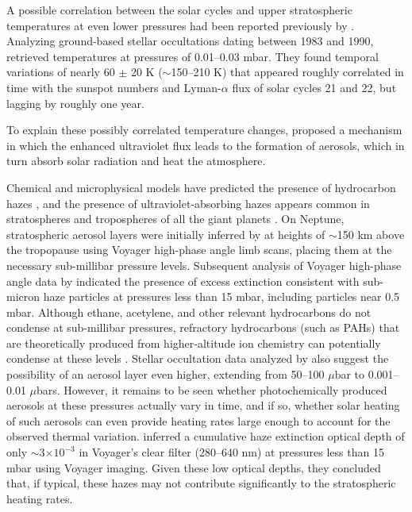 \documentclass[twocolumn,10pt]{aastex631}
\begin{document}
A possible correlation between the solar cycles and upper stratospheric temperatures at even lower pressures had been reported previously by \citet{roques1994neptune}. Analyzing ground-based stellar occultations dating between 1983 and 1990, \citet{roques1994neptune} retrieved temperatures at pressures of 0.01--0.03 mbar. They found temporal variations of nearly 60 $\pm$ 20 K ($\sim$150--210 K) that appeared roughly correlated in time with the sunspot numbers and Lyman-$\alpha$ flux of solar cycles 21 and 22, but lagging by roughly one year. 

To explain these possibly correlated temperature changes, \citet{roques1994neptune} proposed a mechanism in which the enhanced ultraviolet flux leads to the formation of aerosols, which in turn absorb solar radiation and heat the atmosphere.  

Chemical and microphysical models have predicted the presence of hydrocarbon hazes \citep[\textit{e.g.},][]{romani1988methane, romani1989stratospheric,moses1992hydrocarbon,romani1993methane,toledo2020neptune}, and the presence of ultraviolet-absorbing hazes appears common in stratospheres and tropospheres of all the giant planets \citep[\textit{e.g.},][]{west1986clouds,karkoschka2009haze,karkoschka2011neptune,roman2013saturn,zhang2013stratospheric}. On Neptune, stratospheric aerosol layers were initially inferred by \citet{smith1989voyager} at heights of $\sim$150 km above the tropopause using Voyager high-phase angle limb scans, placing them at the necessary sub-millibar pressure levels. Subsequent analysis of Voyager high-phase angle data by \citet{moses1995neptunehazes} indicated the presence of excess extinction consistent with sub-micron haze particles at pressures less than 15 mbar, including particles near 0.5 mbar.  Although ethane, acetylene, and other relevant hydrocarbons do not condense at sub-millibar pressures, refractory hydrocarbons (such as PAHs) that are theoretically produced from higher-altitude ion chemistry can potentially condense at these levels \citep{dobrijevic20161dphotochem}.  Stellar occultation data analyzed by \citet{roques1994neptune} also suggest the possibility of an aerosol layer even higher, extending from 50--100 $\mu$bar to 0.001--0.01 $\mu$bars.  However, it remains to be seen whether photochemically produced aerosols at these pressures actually vary in time, and if so, whether solar heating of such aerosols can even provide heating rates large enough to account for the observed thermal variation. \citet{moses1995neptunehazes} inferred a cumulative haze extinction optical depth of only $\sim$3$\times10^{-3}$ in Voyager's clear filter (280--640 nm) at pressures less than 15 mbar using Voyager imaging. Given these low optical depths, they concluded that, if typical, these hazes may not contribute significantly to the stratospheric heating rates.
\end{document}
